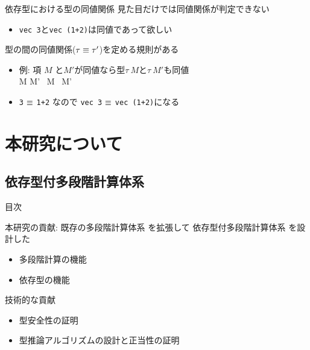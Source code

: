 \documentclass[dvipdfmx,aspectratio=169, 20pt]{beamer}
\begin{document}
\begin{frame}[fragile]{依存型における型の同値関係}
    見た目だけでは同値関係が判定できない
    \begin{itemize}
        \item \verb|vec 3|と\verb|vec (1+2)|は同値であって欲しい
    \end{itemize}
    型の間の同値関係(\( \tau \equiv \tau'\))を定める規則がある\\
    \begin{itemize}
    \item 例: 項 \(M \) と\(M'\)が同値なら型\( \tau\ M \)と\( \tau\ M'\)も同値 \\[2mm]
    \hspace{15mm} {\small \infrule
    { M \E M' }
    { \tau\ M \E \tau\ M'}}
\item \verb|3| \( \equiv \) \verb|1+2| なので \verb|vec 3| \( \equiv \) \verb|vec (1+2)|になる
    \end{itemize}
\end{frame}

\section{本研究について}

\subsection{依存型付多段階計算体系 \LMD}

\begin{frame}{目次}
    \tableofcontents[currentsection]
\end{frame}

\begin{frame}[fragile]{本研究の貢献: \LMD}
    既存の多段階計算体系  を拡張して
    依存型付多段階計算体系 \LMD を設計した
    \begin{itemize}
        \item 多段階計算の機能
        \item 依存型の機能
    \end{itemize}
    技術的な貢献
    \begin{itemize}
        \item 型安全性の証明
        \item 型推論アルゴリズムの設計と正当性の証明
    \end{itemize}
\end{frame}
\end{document}
